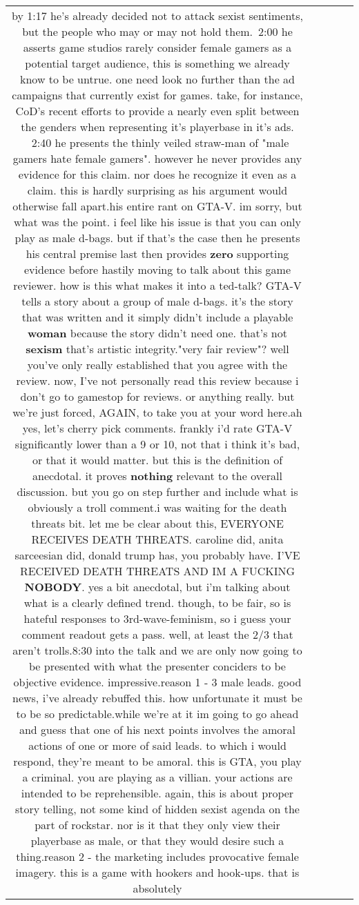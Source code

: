 \documentclass[11pt]{article}
\newlength\mylength
\begin{document}
\begin{center}
\begin{longtable}{|C{.65\mylength}|C{.30\mylength}|C{.12\mylength}|C{.12\mylength}|C{.12\mylength}|}
  \small by 1:17 he's already decided not to attack sexist sentiments, but the people who may or may not hold them.\@ ~2:00 he asserts game studios rarely consider female gamers as a potential target audience, this is something we already know to be untrue. one need look no further than the ad campaigns that currently exist for games. take, for instance, CoD's recent efforts to provide a nearly even split between the genders when representing it's playerbase in it's ads. \@ ~2:40 he presents the thinly veiled straw-man of "male gamers hate female gamers". however he never provides any evidence for this claim. nor does he recognize it even as a claim. this is hardly surprising as his argument would otherwise fall apart.his entire rant on GTA-V. im sorry, but what was the point. i feel like his issue is that you can only play as male d-bags. but if that's the case then he presents his central premise last then provides \textbf{zero} supporting evidence before hastily moving to talk about this game reviewer. how is this what makes it into a ted-talk? GTA-V tells a story about a group of male d-bags. it's the story that was written and it simply didn't include a playable \textbf{woman} because the story didn't need one. that's not \textbf{sexism} that's artistic integrity."very fair review"? well you've only really established that you agree with the review. now, I've not personally read this review because i don't go to gamestop for reviews. or anything really. but we're just forced, AGAIN, to take you at your word here.ah yes, let's cherry pick comments. frankly i'd rate GTA-V significantly lower than a 9 or 10, not that i think it's bad, or that it would matter. but this is the definition of anecdotal. it proves \textbf{nothing} relevant to the overall discussion. but you go on step further and include what is obviously a troll comment.i was waiting for the death threats bit. let me be clear about this, EVERYONE RECEIVES DEATH THREATS. caroline did, anita sarceesian did, donald trump has, you probably have. I'VE RECEIVED DEATH THREATS AND IM A FUCKING \textbf{NOBODY}. yes a bit anecdotal, but i'm talking about what is a clearly defined trend. though, to be fair, so is hateful responses to 3rd-wave-feminism, so i guess your comment readout gets a pass. well, at least the 2/3 that aren't trolls.8:30 into the talk and we are only now going to be presented with what the presenter conciders to be objective evidence. impressive.reason 1 - 3 male leads. good news, i've already rebuffed this. how unfortunate it must be to be so predictable.while we're at it im going to go ahead and guess that one of his next points involves the amoral actions of one or more of said leads. to which i would respond, they're meant to be amoral. this is GTA, you play a criminal. you are playing as a villian. your actions are intended to be reprehensible. again, this is about proper story telling, not some kind of hidden sexist agenda on the part of rockstar. nor is it that they only view their playerbase as male, or that they would desire such a thing.reason 2 - the marketing includes provocative female imagery. this is a game with hookers and hook-ups. that is absolutely 
\end{longtable}
\end{center}
\end{document}
